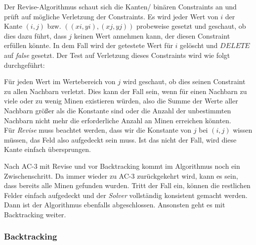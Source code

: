 Der Revise-Algorithmus schaut sich die Kanten/ binären Constraints an und prüft auf mögliche Verletzung der Constraints. Es wird jeder Wert
von $i$ der Kante $(i,j)$ bzw. $((xi, yi), (xj, yj))$ probeweise gesetzt und geschaut, ob dies dazu führt, dass $j$ keinen Wert annehmen kann,
der diesen Constraint erfüllen könnte. In dem Fall wird der getestete Wert für $i$ gelöscht und $DELETE$ auf \textit{false} gesetzt. Der Test
auf Verletzung dieses Constraints wird wie folgt durchgeführt:

Für jeden Wert im Wertebereich von $j$ wird geschaut, ob dies seinen Constraint
zu allen Nachbarn verletzt. Dies kann der Fall sein, wenn für einen Nachbarn zu viele oder zu wenig Minen existieren würden, also die Summe
der Werte aller Nachbarn größer als die Konstante sind oder die Anzahl der unbestimmten Nachbarn nicht mehr die erforderliche Anzahl an Minen 
erreichen könnten.\\
Für \textit{Revise} muss beachtet werden, dass wir die Konstante von $j$ bei $(i,j)$ wissen müssen, das Feld also aufgedeckt sein muss. Ist
das nicht der Fall, wird diese Kante einfach übersprungen.

Nach AC-3 mit Revise und vor Backtracking kommt im Algorithmus noch ein Zwischenschritt. Da immer wieder zu AC-3 zurückgekehrt wird, kann es 
sein, dass bereits alle Minen gefunden wurden. Tritt der Fall ein, können die restlichen Felder einfach aufgedeckt und der \textit{Solver}
vollständig konsistent gemacht werden. Dann ist der Algorithmus ebenfalls abgeschlossen. Ansonsten geht es mit Backtracking weiter.

\subsubsection{Backtracking}

